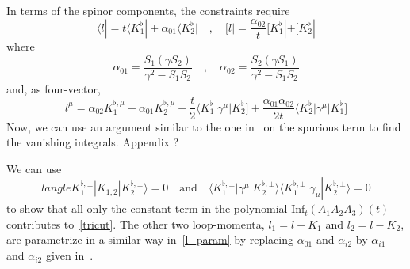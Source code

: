 In terms of the spinor components, the constraints require
\begin{equation}\label{l_param}
\langle l | = t\langle K_1^\flat| + \alpha_{01}\langle K_2^\flat| 
\quad,\quad
[ l | = \frac{\alpha_{02}}{t}[ K_1^\flat| + [ K_2^\flat|
\end{equation}
where
\begin{equation}
\alpha_{01} = \frac{S_1(\gamma S_2)}{\gamma^2 - S_1S_2}\quad,\quad
\alpha_{02} = \frac{S_2(\gamma S_1)}{\gamma^2 - S_1S_2}
\end{equation}
%
and, as four-vector,
\begin{equation}
l^\mu = \alpha_{02} K_1^{\flat,\mu} + \alpha_{01}K_2^{\flat,\mu} + \frac{t}{2}\langle K_1^\flat | \gamma^\mu |K_2^\flat] + \frac{\alpha_{01}\alpha_{02}}{2t}\langle K_2^\flat|\gamma^\mu |K_1^\flat]
\end{equation}
%
Now, we can use an argument similar to the one in~\cite{Ossola:2006us} on the spurious term to find the vanishing integrals.
\color{red}Appendix ?\color{black}
%
\iffalse
To illustrate this argument, we consider the case of a rank-1 3-point-like integral. 
By simple arguments on the rank and the dependence on external momenta, 
\begin{equation}
\int\dd^D q \frac{q^\mu}{D_0(q)D_1(q+p_1)D_2(q+p_2)} = c_1p_1^\mu + c_2p_2^\mu
\end{equation}
If we contract the above relation with a vector $v^\mu$ orthogonal to $p_1$ and $p_2$, we obtain a vanishing integral.
$q\cdot v$ is hence a spurious term.
The same technique can be applied to show that $(q\cdot v)^n$ is spurious for any $n>0$. 
\fi
%
We can use 
\begin{equation}
langle K_1^{\flat,\pm} | K_{1,2}|K_2^{\flat,\pm}\rangle = 0 
\quad\mathrm{and}\quad
\langle K_1^{\flat,\pm}|\gamma^\mu|K_{2}^{\flat,\pm}\rangle\langle K_1^{\flat,\pm}|\gamma_\mu|K_{2}^{\flat,\pm}\rangle = 0
\end{equation}
to show that all only the constant term in the polynomial $\mathrm{Inf}_t(A_1A_2A_3)(t)$ contributes to~\cref{tricut}. 
The other two loop-momenta, $l_1 = l-K_1$ and $l_2 = l-K_2$, are parametrize in a similar way in~\cref{l_param} by replacing $\alpha_{01}$ and $\alpha_{i2}$ by $\alpha_{i1}$ and $\alpha_{i2}$ given in~\cite{Forde:2007mi}.
%
%
